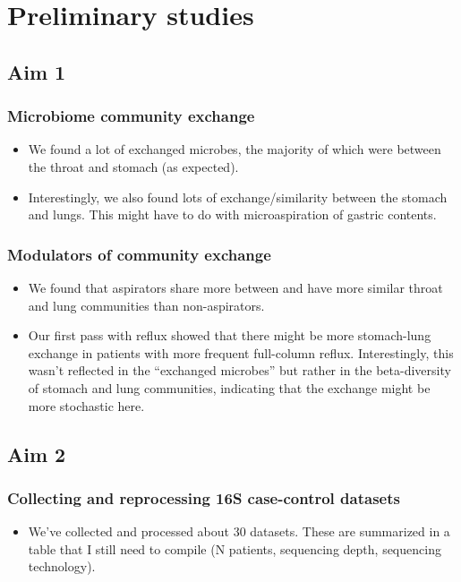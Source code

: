 \documentclass[12pt]{article}
\begin{document}
\section{Preliminary studies}

\subsection{Aim 1}
\subsubsection{Microbiome community exchange}

\begin{itemize}
\item We found a lot of exchanged microbes, the majority of which were between the throat and stomach (as expected). 
\item Interestingly, we also found lots of exchange/similarity between the stomach and lungs. This might have to do with microaspiration of gastric contents. 
\end{itemize}

\subsubsection{Modulators of community exchange}

\begin{itemize}
\item We found that aspirators share more between and have more similar throat and lung communities than non-aspirators.
\item Our first pass with reflux showed that there might be more stomach-lung exchange 
in patients with more frequent full-column reflux. Interestingly, this wasn't reflected 
in the ``exchanged microbes'' but rather in the beta-diversity of stomach and lung 
communities, indicating that the exchange might be more stochastic here.
\end{itemize}

\subsection{Aim 2}
\subsubsection{Collecting and reprocessing 16S case-control datasets}

\begin{itemize}
\item We've collected and processed about 30 datasets. These are summarized in 
a table that I still need to compile (N patients, sequencing depth, sequencing technology).
\end{itemize}
\end{document}
